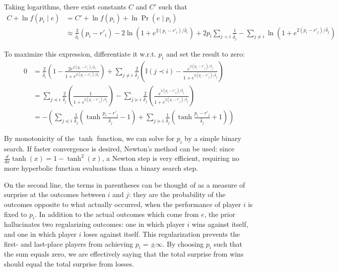 \documentclass{article}
\begin{document}
Taking logarithms, there exist constants $C$ and $C'$ such that
\begin{align*}
C + \ln f(p_i\mid e)
&= C' + \ln f(p_i) + \ln \Pr(e\mid p_i)
\\&\approx \frac{2}{\bar\delta_i} (p_i-r'_i) - 2\ln\left(1 + e^{2(p_i-r'_i)/\bar\delta_i} \right) + 2p_i\sum_{j\prec i} \frac{1}{\bar\delta_j} - \sum_{j\neq i} \ln\left(1 + e^{2(p_i-r'_j)/\bar\delta_j}\right)
\end{align*}

To maximize this expression, differentiate it w.r.t. $p_i$ and set the result to zero:
\begin{align*}
0 &= \frac{2}{\bar\delta_i}\left(1 - \frac {2e^{2(p_i-r'_i)/\bar\delta_i}} {1 + e^{2(p_i-r'_i)/\bar\delta_i}} \right)
+ \sum_{j\neq i}\frac{2}{\bar\delta_j}\left(\mathbb{I}(j\prec i) - \frac {e^{2(p_i-r'_j)/\bar\delta_j}} {1 + e^{2(p_i-r'_j)/\bar\delta_j}} \right)
\\&= \sum_{j\preceq i}\frac{2}{\bar\delta_j}\left(\frac {1} {1 + e^{2(p_i-r'_j)/\bar\delta_j}} \right)
- \sum_{j\succeq i}\frac{2}{\bar\delta_j}\left(\frac {e^{2(p_i-r'_j)/\bar\delta_j}} {1 + e^{2(p_i-r'_j)/\bar\delta_j}} \right)
\\&= -\left( \sum_{j\preceq i}\frac{1}{\bar\delta_j}\left( \tanh\frac {p_i - r'_j} {\bar\delta_j} - 1 \right)
+ \sum_{j\succeq i}\frac{1}{\bar\delta_j}\left( \tanh\frac {p_i - r'_j} {\bar\delta_j} + 1 \right) \right)
\end{align*}

By monotonicity of the $\tanh$ function, we can solve for $p_i$ by a simple binary search. If faster convergence is desired, Newton's method can be used: since $\frac{d}{dx}\tanh(x) = 1 - \tanh^2(x)$, a Newton step is very efficient, requiring no more hyperbolic function evaluations than a binary search step.

On the second line, the terms in parentheses can be thought of as a measure of surprise at the outcomes between $i$ and $j$: they are the probability of the outcomes opposite to what actually occurred, when the performance of player $i$ is fixed to $p_i$. In addition to the actual outcomes which come from $e$, the prior hallucinates two regularizing outcomes: one in which player $i$ wins against itself, and one in which player $i$ loses against itself. This regularization prevents the first- and last-place players from achieving $p_i = \pm\infty$. By choosing $p_i$ such that the sum equals zero, we are effectively saying that the total surprise from wins should equal the total surprise from losses.
\end{document}

